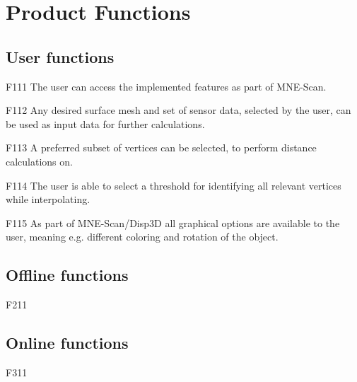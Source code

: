 \section{Product Functions}

\subsection{User functions}

	\begin{aims}
	
		\item[F111]	The user can access the implemented features as part of MNE-Scan.
		\item[F112] Any desired surface mesh and set of sensor data, selected by the user, can be used as input data for further calculations.
		\item[F113] A preferred subset of vertices can be selected, to perform distance calculations on. 
		\item[F114] The user is able to select a threshold for identifying all relevant vertices while interpolating. 
		\item[F115] As part of MNE-Scan/Disp3D all graphical options are available to the user, meaning e.g. different coloring and rotation of the object.
	
	\end{aims}

\subsection{Offline functions}
	
	\begin{aims}
	
		\item[F211]	
	
	\end{aims}
	
\subsection{Online functions}
	
	\begin{aims}
	
		\item[F311]	
	
	\end{aims}